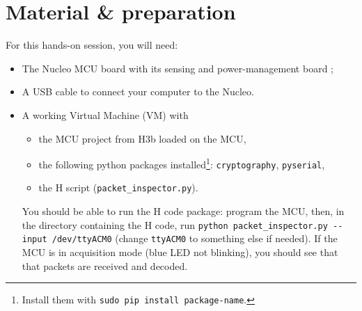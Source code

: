 \section*{Material \& preparation}

For this hands-on session, you will need:
\begin{itemize}
    \item The Nucleo MCU board with its sensing and power-management board ;
    \item A USB cable to connect your computer to the Nucleo.
    \item A working Virtual Machine (VM) with
        \begin{itemize}
            \item the MCU project from H3b loaded on the MCU,
            \item the following python packages installed\footnote{%
                    Install them with \texttt{sudo pip install package-name}.
                }:
                \texttt{cryptography}, \texttt{pyserial},
            \item the H\handsOnN{} script (\texttt{packet\_inspector.py}).
        \end{itemize}
        You should be able to run the H\handsOnN{} code package:
        program the MCU, then, in the directory containing the
        H\handsOnN{} code, run \texttt{python packet\_inspector.py -{}-input
        /dev/ttyACM0} (change \texttt{ttyACM0} to something else if needed).
        If the MCU is in acquisition mode (blue LED not blinking), you should
        see that that packets are received and decoded.
\end{itemize}
